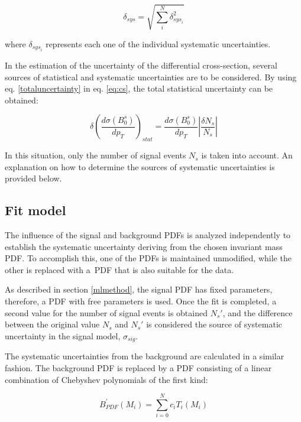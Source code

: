 \begin{equation}
	\delta_{sys} = \sqrt{\sum_{i}^{N} \delta_{{sys}_{i}}^2}
\end{equation}

where $\delta_{{sys}_i}$ represents each one of the individual systematic uncertainties.

In the estimation of the uncertainty of the differential cross-section, several sources of statistical and systematic uncertainties are to be considered. By using eq. \ref{totaluncertainty} in eq. \ref{eq:cs}, the total statistical uncertainty can be obtained:

\begin{equation}
	\delta \left(\frac{d\sigma(B_0^s)}{dp_T} \right)_{stat} 
 =\frac{d \sigma(B_0^s)}{dp_T}\left| \frac{\delta N_s}{N_s}\right|
 \end{equation}

In this situation, only the number of signal events $N_s$ is taken into account. An explanation on how to determine the sources of systematic uncertainties is provided below. 

\subsection{Fit model}

The influence of the signal and background PDFs is analyzed independently to establish the systematic uncertainty deriving from the chosen invariant mass PDF. To accomplish this, one of the PDFs is maintained unmodified, while the other is replaced with a PDF that is also suitable for the data.

As described in section \ref{mlmethod}, the signal PDF has fixed parameters, therefore, a PDF with free parameters is used. Once the fit is completed, a second value for the number of signal events is obtained $N_s'$, and the difference between the original value $N_s$ and $N_s'$ is considered the source of systematic uncertainty in the signal model, $\sigma_{sig}$.

The systematic uncertainties from the background are calculated in a similar fashion. The background PDF is replaced by a PDF consisting of a linear combination of Chebyshev polynomials of the first kind:

\begin{equation}
	B_{PDF}^{'}(M_i) = \sum_{i=0}^{N} c_i T_i(M_i) 
\end{equation}

